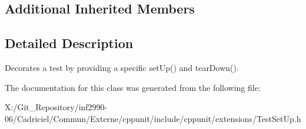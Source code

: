 \subsection*{Additional Inherited Members}


\subsection{Detailed Description}
Decorates a test by providing a specific set\-Up() and tear\-Down(). 

The documentation for this class was generated from the following file\-:\begin{DoxyCompactItemize}
\item 
X\-:/\-Git\-\_\-\-Repository/inf2990-\/06/\-Cadriciel/\-Commun/\-Externe/cppunit/include/cppunit/extensions/Test\-Set\-Up.\-h\end{DoxyCompactItemize}
